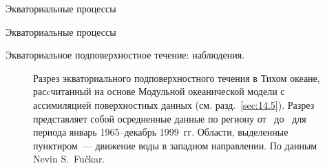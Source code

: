 \begin{chapter}{Экваториальные процессы}
\begin{section}{Экваториальные процессы}
\begin{paragraph}{Экваториальное подповерхностное течение: наблюдения.}
\begin{figure}[t!]
\caption{Разрез экваториального подповерхностного течения в Тихом
океане, расcчитанный на основе Модульной океанической модели с
ассимиляцией поверхностных данных (см. разд.~\ref{sec:14.5}). 
Разрез представляет собой осредненные данные по региону 
от~ до~ для периода январь 1965--декабрь 1999~гг. 
Области, выделенные пунктиром~--- движение воды в западном направлении. 
По данным Nevin S.\ Fu\v{c}kar.}
\label{fig:equatorialxsec}
\end{figure}
%
%
\end{paragraph}


\end{section}
\end{chapter}
